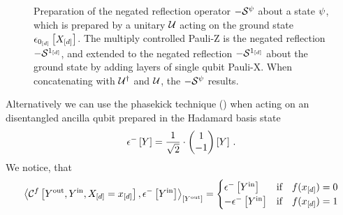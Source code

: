 \begin{figure}[t]
    \begin{center}
        
    \end{center}
    \caption{
        Preparation of the negated reflection operator $-\mathcal{S}^{\psi}$ about a state $\psi$, which is prepared by a unitary $\mathcal{U}$ acting on the ground state $\epsilon_{0_{[d]}}\left[X_{[d]}\right]$.
        The multiply controlled Pauli-Z is the negated reflection $-\mathcal{S}^{1_{[d]}}$, and extended to the negated reflection $-\mathcal{S}^{1_{[d]}}$ about the ground state by adding layers of single qubit Pauli-X.
        When concatenating with $\mathcal{U}^{\dagger}$ and $\mathcal{U}$, the $-\mathcal{S}^{\psi}$ results.
    }
    \label{fig:reflectionZRealization}
\end{figure}

Alternatively we can use the phasekick technique () when acting on an disentangled ancilla qubit prepared in the Hadamard basis state
\begin{align*}
    \epsilon^{-}\left[Y\right]
    = \frac{1}{\sqrt{2}} \cdot \begin{pmatrix} 1 \\ -1 \end{pmatrix}\left[Y\right] \, .
\end{align*}
We notice, that
\begin{align*}
    \left\langle 
        \mathcal{C}^{f}\left[Y^{\mathrm{out}},Y^{\mathrm{in}},X_{[d]}=x_{[d]}\right],
        \epsilon^{-}\left[Y^{\mathrm{in}}\right]
    \right\rangle_{\left[ Y^{\mathrm{out}} \right]}
    = \begin{cases}
          \epsilon^{-}\left[Y^{\mathrm{in}}\right] & \text{if}\quad f(x_{[d]}) = 0\\
          -\epsilon^{-}\left[Y^{\mathrm{in}}\right] & \text{if}\quad f(x_{[d]}) = 1
    \end{cases}
\end{align*}

